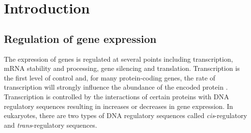 \documentclass[../main.tex]{subfiles}
\begin{document}
\chapter{Introduction}\label{chapter1}
\section{Regulation of gene expression}\label{chapter1:regulation-of-gene-expression}
The expression of genes is regulated at several points including transcription, mRNA stability and processing, gene silencing and translation.
Transcription is the first level of control and, for many protein\hyp{}coding genes, the rate of transcription will strongly influence the abundance of the encoded protein \autocite{liuDependencyCellularProtein2016}.
Transcription is controlled by the interactions of certain proteins with DNA regulatory sequences resulting in increases or decreases in gene expression.
In eukaryotes, there are two types of DNA regulatory sequences called \textit{cis}\hyp{}regulatory and \textit{trans}\hyp{}regulatory sequences.
\end{document}
